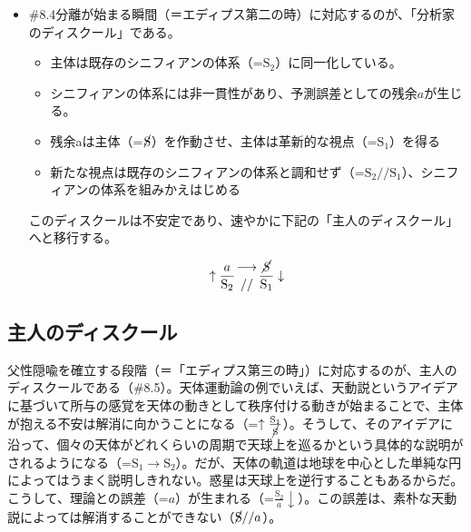 \begin{note}{}
  \begin{itemize}
    \tightlist
    \item{\#8.4}分離が始まる瞬間（＝エディプス第二の時）に対応するのが、「分析家のディスクール」である。
      \begin{itemize}
        \tightlist
        \item 主体は既存のシニフィアンの体系（=$\textrm{S}_2$）に同一化している。
        \item シニフィアンの体系には非一貫性があり、予測誤差としての残余$a$が生じる。
        \item 残余aは主体（=$\cancel{\textrm{S}}$）を作動させ、主体は革新的な視点（=$\textrm{S}_1$）を得る
        \item 新たな視点は既存のシニフィアンの体系と調和せず（=$\textrm{S}_2//\textrm{S}_1$）、シニフィアンの体系を組みかえはじめる
      \end{itemize}このディスクールは不安定であり、速やかに下記の「主人のディスクール」へと移行する。

$$
\uparrow\frac{a}{\mathrm{S_2}}\genfrac{}{}{0pt}{}{\longrightarrow}{//}\frac{\mathrm{\cancel{S}}}{\mathrm{S_1}}\downarrow
$$
  \end{itemize}
\end{note}

\subsection{主人のディスクール}\label{ux4e3bux4ebaux306eux30c7ux30a3ux30b9ux30afux30fcux30eb}

父性隠喩を確立する段階（＝「エディプス第三の時」）に対応するのが、主人のディスクールである（\#8.5）。天体運動論の例でいえば、天動説というアイデアに基づいて所与の感覚を天体の動きとして秩序付ける動きが始まることで、主体が抱える不安は解消に向かうことになる（=\(\uparrow\frac{\textrm{S}_1}{\cancel{\textrm{S}}}\)）。そうして、そのアイデアに沿って、個々の天体がどれくらいの周期で天球上を巡るかという具体的な説明がされるようになる（=\(\textrm{S}_1\rightarrow\textrm{S}_2\)）。だが、天体の軌道は地球を中心とした単純な円によってはうまく説明しきれない。惑星は天球上を逆行することもあるからだ。こうして、理論との誤差（=\(a\)）が生まれる（=\(\frac{\textrm{S}_2}{a}\downarrow\)）。この誤差は、素朴な天動説によっては解消することができない（\(\cancel{\textrm{S}}//a\)）。

